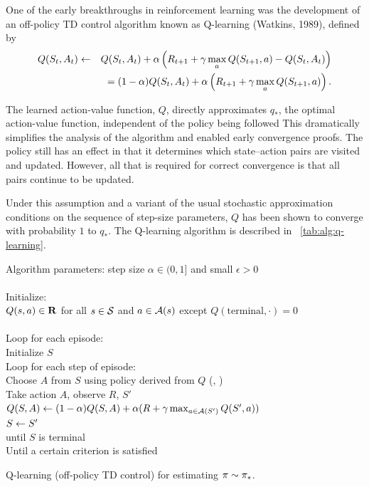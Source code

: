 One of the early breakthroughs in reinforcement learning was
the development of an off-policy TD control algorithm known as Q-learning (Watkins, 1989),
defined by
\begin{eqnarray}
\nonumber
Q(S_{t}, A_t) &\leftarrow&
Q(S_{t}, A_t) + \alpha \left(
R_{t+1}
+ \gamma \max_{a} Q(S_{t+1},a) - Q(S_{t},A_t)
\right)
\\&&
=
(1-\alpha) Q(S_{t}, A_t) + \alpha \left(
R_{t+1}
+ \gamma \max_{a} Q(S_{t+1},a)
\right).
\end{eqnarray}


The learned action-value function, $Q$, directly approximates $q_\ast$,
the optimal action-value function, independent of the policy being followed
This dramatically simplifies the analysis of the algorithm and enabled early convergence proofs.
The policy still has an effect in that it determines which state–action pairs are visited and updated.
However, all that is required for correct convergence is that all pairs continue to be updated.

Under this assumption and a variant of the usual stochastic approximation conditions
on the sequence of step-size parameters,
$Q$ has been shown to converge with probability $1$ to $q_\ast$.
The Q-learning algorithm is described in \tablename~\ref{tab:alg:q-learning}.



\begin{table}
\beginalg
Algorithm parameters: step size $\alpha \in (0, 1]$ and small $\epsilon>0$\\
\\
Initialize:\\
\> $Q(s,a) \in \mathbf{R}$ for all $s\in\mathcal{S}$ and $a\in\mathcal{A}(s)$
    except $Q(\mathrm{terminal}, \cdot)=0$\\
\\
Loop for each episode:\\
\> Initialize $S$\\
\> Loop for each step of episode:\\
\> \> Choose $A$ from $S$ using policy derived from $Q$ (\eg, \epsgreedy)\\
\> \> Take action $A$, observe $R$, $S'$\\
\> \> $Q(S,A) \leftarrow (1-\alpha) Q(S,A) + \alpha (R + \gamma \max_{a\in\mathcal{A}(S')}Q(S',a))$\\
\> \> $S \leftarrow S'$\\
\> until $S$ is terminal\\
Until a certain criterion is satisfied
\endalg
\caption{Q-learning (off-policy TD control) for estimating $\pi \sim {\ensuremath{\pi}}_\ast$.}
\label{tab:alg:q-learning}
\end{table}


